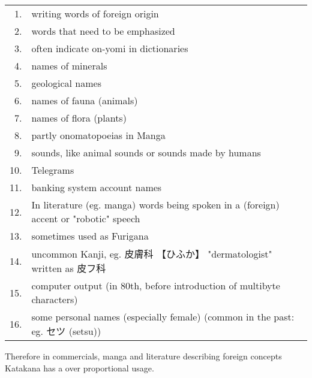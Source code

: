 \begin{tabular}{rp{15cm}}
1.& writing words of foreign origin\\
2.& words that need to be emphasized\\
3. &often indicate on-yomi in dictionaries\\
4.& names of minerals \\
5.& geological names \\
6.& names of fauna (animals)\\
7.& names of flora (plants)\\
8.& partly onomatopoeias in Manga\\
9.& sounds, like animal sounds or sounds made by humans\\
10.& Telegrams \\
11.& banking system account names\\
12.& In literature (eg. manga) words being spoken in a (foreign) accent or "robotic" speech\\
13. &sometimes used as Furigana\\
14. & uncommon Kanji, eg.  {皮膚科} {【ひふか】} "dermatologist" written as {皮フ科}\\
15.& computer output (in 80th, before introduction of multibyte characters)\\
16. &some personal names (especially female) (common in the past: eg. セツ (setsu))\\
\end{tabular}

\medskip

Therefore in commercials, manga and literature describing foreign concepts
Katakana has a over proportional usage.



%

